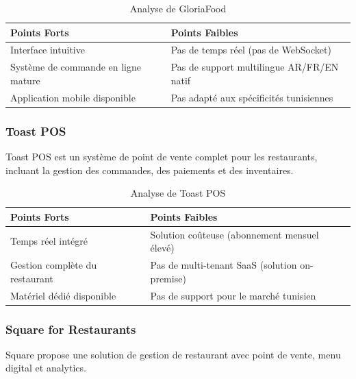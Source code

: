 \documentclass[12pt,a4paper]{report}
\begin{document}
\begin{table}[H]
    \centering
    \begin{tabularx}{\textwidth}{l X}
        \toprule
        \rowcolor{primary!10}
        \textbf{Points Forts} & \textbf{Points Faibles} \\
        \midrule
        Interface intuitive & Pas de temps réel (pas de WebSocket) \\
        Système de commande en ligne mature & Pas de support multilingue AR/FR/EN natif \\
        Application mobile disponible & Pas adapté aux spécificités tunisiennes \\
        \bottomrule
    \end{tabularx}
    \caption{Analyse de GloriaFood}
    \label{tab:gloriafood}
\end{table}

\subsubsection{Toast POS}

Toast POS est un système de point de vente complet pour les restaurants, incluant la gestion des commandes, des paiements et des inventaires.

\begin{table}[H]
    \centering
    \begin{tabularx}{\textwidth}{l X}
        \toprule
        \rowcolor{secondary!10}
        \textbf{Points Forts} & \textbf{Points Faibles} \\
        \midrule
        Temps réel intégré & Solution coûteuse (abonnement mensuel élevé) \\
        Gestion complète du restaurant & Pas de multi-tenant SaaS (solution on-premise) \\
        Matériel dédié disponible & Pas de support pour le marché tunisien \\
        \bottomrule
    \end{tabularx}
    \caption{Analyse de Toast POS}
    \label{tab:toast}
\end{table}

\subsubsection{Square for Restaurants}

Square propose une solution de gestion de restaurant avec point de vente, menu digital et analytics.
\end{document}
